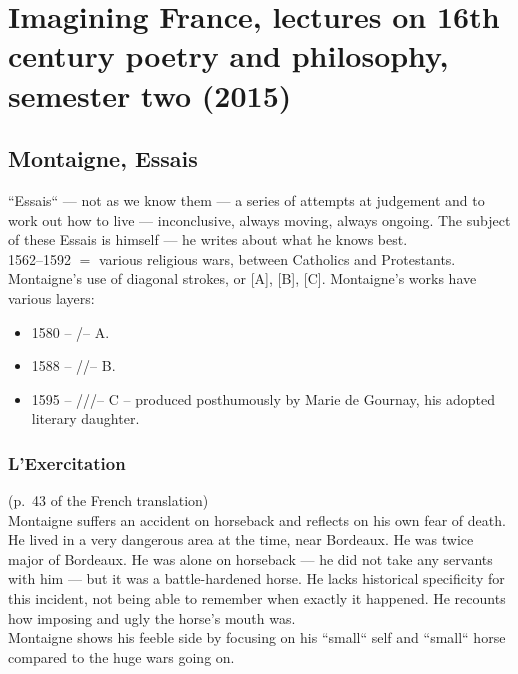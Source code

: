 \documentclass{article}
\begin{document}
\section*{Imagining France, lectures on 16th century poetry and philosophy, semester two (2015)}

\subsection*{Montaigne, Essais}

``Essais`` --- not as we know them --- a series of attempts at
judgement and to work out how to live --- inconclusive, always moving,
always ongoing. The subject of these Essais is himself --- he writes
about what he knows best.\\

1562--1592 $=$ various religious wars, between Catholics and
Protestants.\\

Montaigne's use of diagonal strokes, or [A], [B], [C]. Montaigne's
works have various layers:

\begin{itemize}
  \item{1580 -- \slash -- A.}
  \item{1588 -- \slash\slash -- B.}
  \item{1595 -- \slash\slash\slash -- C -- produced posthumously by Marie de
        Gournay, his adopted literary daughter.}
\end{itemize}

\subsubsection*{L'Exercitation}

(p.\ 43 of the French translation)\\

Montaigne suffers an accident on horseback and reflects on his own
fear of death. He lived in a very dangerous area at the time, near
Bordeaux. He was twice major of Bordeaux. He was alone on horseback
--- he did not take any servants with him --- but it was a
battle-hardened horse. He lacks historical specificity for this
incident, not being able to remember when exactly it happened. He
recounts how imposing and ugly the horse's mouth was.\\

Montaigne shows his feeble side by focusing on his ``small`` self and
``small`` horse compared to the huge wars going on.\\
\end{document}
